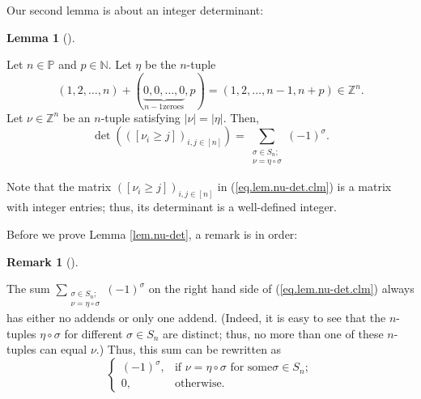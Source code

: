 \documentclass[numbers=enddot,12pt,final,onecolumn,notitlepage,english]{scrartcl}%
\theoremstyle{definition}
\newtheorem{lem}[theo]{Lemma}
\newenvironment{lemma}[1][]
{\begin{lem}[#1]\begin{leftbar}}
{\end{leftbar}\end{lem}}
\newtheorem{remk}[theo]{Remark}
\newenvironment{remark}[1][]
{\begin{remk}[#1]\begin{leftbar}}
{\end{leftbar}\end{remk}}
\let\sumnonlimits\sum
\renewcommand{\sum}{\sumnonlimits\limits}
\begin{document}
Our second lemma is about an integer determinant:

\begin{lemma}
\label{lem.nu-det}Let $n\in\mathbb{P}$ and $p\in\mathbb{N}$. Let $\eta$ be the
$n$-tuple
\[
\left(  1,2,\ldots,n\right)  +\left(  \underbrace{0,0,\ldots,0}_{n-1\text{
zeroes}},p\right)  =\left(  1,2,\ldots,n-1,n+p\right)  \in\mathbb{Z}^{n}.
\]
Let $\nu\in\mathbb{Z}^{n}$ be an $n$-tuple satisfying $\left\vert
\nu\right\vert =\left\vert \eta\right\vert $. Then,
\begin{equation}
\det\left(  \left(  \left[  \nu_{i}\geq j\right]  \right)  _{i,j\in\left[
n\right]  }\right)  =\sum_{\substack{\sigma\in S_{n};\\\nu=\eta\circ\sigma
}}\left(  -1\right)  ^{\sigma}. \label{eq.lem.nu-det.clm}%
\end{equation}

\end{lemma}

Note that the matrix $\left(  \left[  \nu_{i}\geq j\right]  \right)
_{i,j\in\left[  n\right]  }$ in (\ref{eq.lem.nu-det.clm}) is a matrix with
integer entries; thus, its determinant is a well-defined integer.

Before we prove Lemma \ref{lem.nu-det}, a remark is in order:

\begin{remark}
The sum $\sum_{\substack{\sigma\in S_{n};\\\nu=\eta\circ\sigma}}\left(
-1\right)  ^{\sigma}$ on the right hand side of (\ref{eq.lem.nu-det.clm})
always has either no addends or only one addend. (Indeed, it is easy to see
that the $n$-tuples $\eta\circ\sigma$ for different $\sigma\in S_{n}$ are
distinct; thus, no more than one of these $n$-tuples can equal $\nu$.) Thus,
this sum can be rewritten as
\[%
\begin{cases}
\left(  -1\right)  ^{\sigma}, & \text{if }\nu=\eta\circ\sigma\text{ for some
}\sigma\in S_{n};\\
0, & \text{otherwise.}%
\end{cases}
\]

\end{remark}
\end{document}
